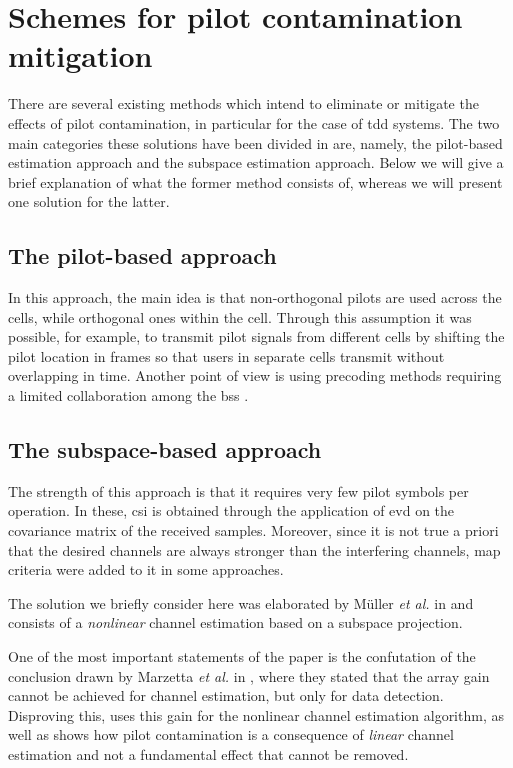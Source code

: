 \documentclass[11pt]{book}
\begin{document}
\section{Schemes for pilot contamination mitigation}
There are several existing methods which intend to eliminate or mitigate the effects of pilot contamination, in particular for the case of \gls{tdd} systems. The two main categories these solutions have been divided in are, namely, the pilot-based estimation approach and the subspace estimation approach. Below we will give a brief explanation of what the former method consists of, whereas we will present one solution for the latter.

\subsection{The pilot-based approach}
In this approach, the main idea is that non-orthogonal pilots are used across the cells, while orthogonal ones within the cell. Through this assumption it was possible, for example, to transmit pilot signals from different cells by shifting the pilot location in frames so that users in separate cells transmit without overlapping in time. Another point of view is using precoding methods requiring a limited collaboration among the \gls{bs}s \cite{Elijah2016}.

\subsection{The subspace-based approach}
The strength of this approach is that it requires very few pilot symbols per operation. In these, \gls{csi} is obtained through the application of \gls{evd} on the covariance matrix of the received samples. Moreover, since it is not true a priori that the desired channels are always stronger than the interfering channels, \gls{map} criteria were added to it in some approaches.

The solution we briefly consider here was elaborated by M\"uller \textit{et al.} in \cite{Ralf} and consists of a \textit{nonlinear} channel estimation based on a subspace projection.

One of the most important statements of the paper is the confutation of the conclusion drawn by Marzetta \textit{et al.} in \cite{Marzetta2010}, where they stated that the array gain cannot be achieved for channel estimation, but only for data detection. Disproving this, \cite{Ralf} uses this gain for the nonlinear channel estimation algorithm, as well as shows how pilot contamination is a consequence of \textit{linear} channel estimation and not a fundamental effect that cannot be removed.
\end{document}

